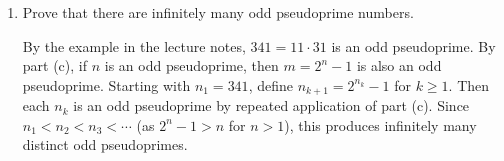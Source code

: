 \begin{enumerate}
\begin{enumerate}
\begin{subprove}
      Then $m = 2^{ab}-1 = (2^a)^b-1$, which is divisible by $2^a-1$. This proves $m$ is composite.
      To show $m$ is an odd pseudoprime, it suffices by part (b) to show that $2^{m-1} \equiv 1 \pmod{m}$.
      The exponent is written as $m-1 = 2^n - 2 = 2(2^{n-1} - 1)$.
      From the fact that $2^{n-1} \equiv 1 \pmod{n}$, it is known that $n \mid (2^{n-1} - 1)$.
      By part (a), this implies that $(2^n - 1) \mid (2^{2^{n-1}-1} - 1)$.
      This is equivalent to $m \mid (2^{(m-1)/2} - 1)$, which means $2^{(m-1)/2} \equiv 1 \pmod{m}$.
      By squaring both sides, the desired result $2^{m-1} \equiv 1 \pmod{m}$ is obtained.
    \end{subprove}
    \item Prove that there are infinitely many odd pseudoprime numbers.
    \begin{subprove}
      By the example in the lecture notes, $341 = 11 \cdot 31$ is an odd pseudoprime. 
      By part (c), if $n$ is an odd pseudoprime, then $m = 2^n - 1$ is also an odd pseudoprime.
      Starting with $n_1 = 341$, define $n_{k+1} = 2^{n_k} - 1$ for $k \geq 1$.
      Then each $n_k$ is an odd pseudoprime by repeated application of part (c).
      Since $n_1 < n_2 < n_3 < \cdots$ (as $2^n - 1 > n$ for $n > 1$), this produces infinitely many distinct odd pseudoprimes.
    \end{subprove}
  \end{enumerate}






\end{enumerate}
